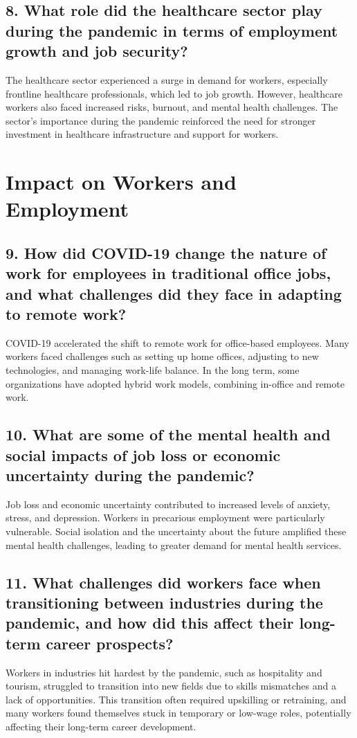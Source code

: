 \documentclass[12pt]{article}
\begin{document}
\subsection*{8. What role did the healthcare sector play during the pandemic in terms of employment growth and job security?}
The healthcare sector experienced a surge in demand for workers, especially frontline healthcare professionals, which led to job growth. However, healthcare workers also faced increased risks, burnout, and mental health challenges. The sector's importance during the pandemic reinforced the need for stronger investment in healthcare infrastructure and support for workers.

\section*{Impact on Workers and Employment}

\subsection*{9. How did COVID-19 change the nature of work for employees in traditional office jobs, and what challenges did they face in adapting to remote work?}
COVID-19 accelerated the shift to remote work for office-based employees. Many workers faced challenges such as setting up home offices, adjusting to new technologies, and managing work-life balance. In the long term, some organizations have adopted hybrid work models, combining in-office and remote work.

\subsection*{10. What are some of the mental health and social impacts of job loss or economic uncertainty during the pandemic?}
Job loss and economic uncertainty contributed to increased levels of anxiety, stress, and depression. Workers in precarious employment were particularly vulnerable. Social isolation and the uncertainty about the future amplified these mental health challenges, leading to greater demand for mental health services.

\subsection*{11. What challenges did workers face when transitioning between industries during the pandemic, and how did this affect their long-term career prospects?}
Workers in industries hit hardest by the pandemic, such as hospitality and tourism, struggled to transition into new fields due to skills mismatches and a lack of opportunities. This transition often required upskilling or retraining, and many workers found themselves stuck in temporary or low-wage roles, potentially affecting their long-term career development.
\end{document}
